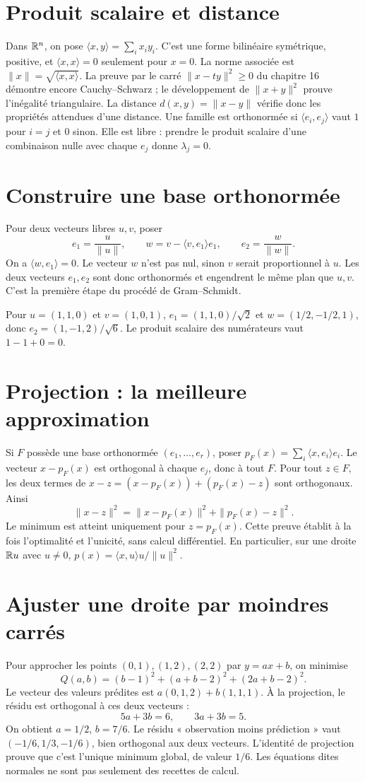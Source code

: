 \documentclass[../cours_1re.tex]{subfiles}
\begin{document}
\section{Produit scalaire et distance}
Dans $\mathbb{R}^n$, on pose $\langle x,y\rangle=\sum_ix_iy_i$.
C'est une forme bilinéaire symétrique, positive, et
$\langle x,x\rangle=0$ seulement pour $x=0$.
La norme associée est $\|x\|=\sqrt{\langle x,x\rangle}$.
La preuve par le carré $\|x-ty\|^2\ge0$ du chapitre 16 démontre encore
Cauchy--Schwarz ; le développement de $\|x+y\|^2$ prouve l'inégalité triangulaire.
La distance $d(x,y)=\|x-y\|$ vérifie donc les propriétés attendues d'une distance.
Une famille est orthonormée si $\langle e_i,e_j\rangle$ vaut $1$ pour $i=j$
et $0$ sinon. Elle est libre : prendre le produit scalaire d'une combinaison
nulle avec chaque $e_j$ donne $\lambda_j=0$.

\section{Construire une base orthonormée}
Pour deux vecteurs libres $u,v$, poser
\[
e_1=\frac u{\|u\|},\qquad w=v-\langle v,e_1\rangle e_1,\qquad
e_2=\frac w{\|w\|}.
\]
On a $\langle w,e_1\rangle=0$. Le vecteur $w$ n'est pas nul, sinon
$v$ serait proportionnel à $u$. Les deux vecteurs $e_1,e_2$ sont donc
orthonormés et engendrent le même plan que $u,v$.
C'est la première étape du procédé de Gram--Schmidt.
\begin{exemple}
Pour $u=(1,1,0)$ et $v=(1,0,1)$,
$e_1=(1,1,0)/\sqrt2$ et
$w=(1/2,-1/2,1)$, donc $e_2=(1,-1,2)/\sqrt6$.
Le produit scalaire des numérateurs vaut $1-1+0=0$.
\end{exemple}

\section{Projection : la meilleure approximation}
Si $F$ possède une base orthonormée $(e_1,\ldots,e_r)$, poser
$p_F(x)=\sum_i\langle x,e_i\rangle e_i$.
Le vecteur $x-p_F(x)$ est orthogonal à chaque $e_j$, donc à tout $F$.
Pour tout $z\in F$, les deux termes de
$x-z=(x-p_F(x))+(p_F(x)-z)$ sont orthogonaux. Ainsi
\[
\|x-z\|^2=\|x-p_F(x)\|^2+\|p_F(x)-z\|^2.
\]
Le minimum est atteint uniquement pour $z=p_F(x)$.
Cette preuve établit à la fois l'optimalité et l'unicité, sans calcul différentiel.
En particulier, sur une droite $\mathbb{R} u$ avec $u\ne0$,
$p(x)=\langle x,u\rangle u/\|u\|^2$.

\section{Ajuster une droite par moindres carrés}
Pour approcher les points $(0,1),(1,2),(2,2)$ par $y=ax+b$, on minimise
\[
Q(a,b)=(b-1)^2+(a+b-2)^2+(2a+b-2)^2.
\]
Le vecteur des valeurs prédites est $a(0,1,2)+b(1,1,1)$.
À la projection, le résidu est orthogonal à ces deux vecteurs :
\[
5a+3b=6,\qquad 3a+3b=5.
\]
On obtient $a=1/2$, $b=7/6$. Le résidu « observation moins prédiction »
vaut $(-1/6,1/3,-1/6)$, bien orthogonal aux deux vecteurs.
L'identité de projection prouve que c'est l'unique minimum global, de valeur
$1/6$. Les équations dites normales ne sont pas seulement des recettes de calcul.
\end{document}
